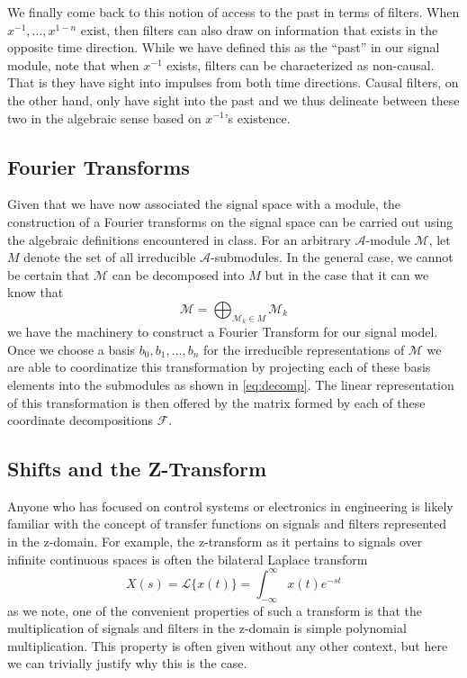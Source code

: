 \documentclass[12pt,technote]{IEEEtran}
\begin{document}
We finally come back to this notion of access to the past in terms of filters. When $x^{-1}, \dots, x^{1-n}$ exist, then filters can also draw on information that exists in the opposite time direction. While we have defined this as the ``past'' in our signal module, note that when $x^{-1}$ exists, filters can be characterized as non-causal. That is they have sight into impulses from both time directions. Causal filters, on the other hand, only have sight into the past and we thus delineate between these two in the algebraic sense based on $x^{-1}$'s existence.

\subsection{Fourier Transforms}
Given that we have now associated the signal space with a module, the construction of a Fourier transforms on the signal space can be carried out using the algebraic definitions encountered in class. For an arbitrary $\mathcal{A}$-module $\mathcal{M}$, let $M$ denote the set of all irreducible $\mathcal{A}$-submodules. In the general case, we cannot be certain that $\mathcal{M}$ can be decomposed into $M$ but in the case that it can we know that
\begin{equation}
    \mathcal{M} = \bigoplus_{\mathcal{M}_k\in M}\mathcal{M}_k\label{eq:decomp}
\end{equation}
we have the machinery to construct a Fourier Transform for our signal model. Once we choose a basis $b_0, b_1, \dots, b_n$ for the irreducible representations of $\mathcal{M}$ we are able to coordinatize this transformation by projecting each of these basis elements into the submodules as shown in \eqref{eq:decomp}. The linear representation of this transformation is then offered by the matrix formed by each of these coordinate decompositions $\mathcal{F}$.



\subsection{Shifts and the Z-Transform}

Anyone who has focused on control systems or electronics in engineering is likely familiar with the concept of transfer functions on signals and filters represented in the z-domain. For example, the z-transform as it pertains to signals over infinite continuous spaces is often the bilateral Laplace transform
\begin{equation*}
    X(s) = \mathcal{L}\{x(t)\} = \int_{-\infty}^\infty x(t)e^{-st}
\end{equation*}
as we note, one of the convenient properties of such a transform is that the multiplication of signals and filters in the z-domain is simple polynomial multiplication. This property is often given without any other context, but here we can trivially justify why this is the case.
\end{document}
